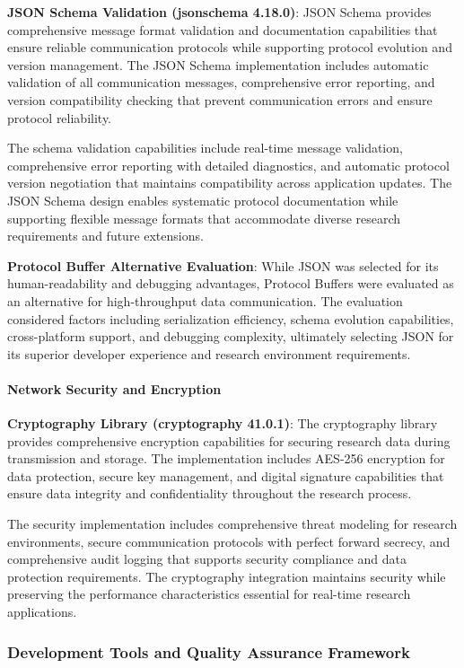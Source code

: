 \documentclass[11pt,a4paper]{report}
\begin{document}
\textbf{JSON Schema Validation (jsonschema 4.18.0)}: JSON Schema provides comprehensive message format validation and
documentation capabilities that ensure reliable communication protocols while supporting protocol evolution and version
management. The JSON Schema implementation includes automatic validation of all communication messages, comprehensive
error reporting, and version compatibility checking that prevent communication errors and ensure protocol reliability.

The schema validation capabilities include real-time message validation, comprehensive error reporting with detailed
diagnostics, and automatic protocol version negotiation that maintains compatibility across application updates. The
JSON Schema design enables systematic protocol documentation while supporting flexible message formats that accommodate
diverse research requirements and future extensions.

\textbf{Protocol Buffer Alternative Evaluation}: While JSON was selected for its human-readability and debugging advantages,
Protocol Buffers were evaluated as an alternative for high-throughput data communication. The evaluation considered
factors including serialization efficiency, schema evolution capabilities, cross-platform support, and debugging
complexity, ultimately selecting JSON for its superior developer experience and research environment requirements.

\paragraph{Network Security and Encryption}

\textbf{Cryptography Library (cryptography 41.0.1)}: The cryptography library provides comprehensive encryption capabilities
for securing research data during transmission and storage. The implementation includes AES-256 encryption for data
protection, secure key management, and digital signature capabilities that ensure data integrity and confidentiality
throughout the research process.

The security implementation includes comprehensive threat modeling for research environments, secure communication
protocols with perfect forward secrecy, and comprehensive audit logging that supports security compliance and data
protection requirements. The cryptography integration maintains security while preserving the performance
characteristics essential for real-time research applications.

\subsubsection{Development Tools and Quality Assurance Framework}
\end{document}
